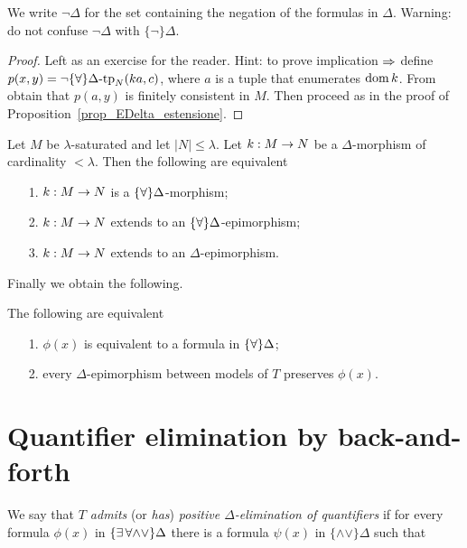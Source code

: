 We write \emph{$\neg\Delta$} for the set containing the negation of the formulas in $\Delta$. Warning: do not confuse $\neg\Delta$ with $\{\neg\}\Delta$.

\begin{proof} Left as an exercise for the reader. Hint: to prove implication $\Rightarrow$ define $p(x,y)=\neg\{\forall\}\Delta\mbox{-}\textrm{tp}_N (ka,c)$, where $a$ is a tuple that enumerates $\mathop{\rm dom} k$. From  obtain that $p(a,y)$ is finitely consistent in $M$. Then proceed as in the proof of Proposition~\ref{prop_EDelta_estensione}.
\end{proof}

\begin{corollary}\label{corol_ADelta_estensione}
Let $M$ be $\lambda$-saturated and let $|N|\le\lambda$. Let $k:M\rightarrow N$ be a $\Delta$-morphism of cardinality $<\lambda$. Then the following are equivalent
\begin{itemize}
\item[1.] $k:M\rightarrow N$ is a $\{\forall\}\Delta$-morphism;
\item[2.] $k:M\rightarrow N$ extends to an $\{\forall\}\Delta$-epimorphism;
\item[3.] $k:M\rightarrow N$ extends to an $\Delta$-epimorphism.\QED
\end{itemize}
\end{corollary}

Finally we obtain the following.

\begin{theorem}
The following are equivalent
\begin{itemize}
\item[1.] $\phi(x)$ is equivalent to a formula in $\{\forall\}\Delta$;
\item[2.] every $\Delta$-epimorphism between models of $T$ preserves $\phi(x)$.\QED
\end{itemize}
\end{theorem}


\section{Quantifier elimination by back-and-forth}
\label{eliminazionequantificatoricriterio}

We say that \emph{$T$ admits\/} (or \emph{has\/}) \emph{positive $\Delta$-elimination of quantifiers\/} if for every formula $\phi(x)$ in $\{\exists\,\forall\mathord\wedge\mathord\vee\}\Delta$ there is a formula $\psi(x)$ in $\{\mathord\wedge\mathord\vee\}\Delta$ such that

